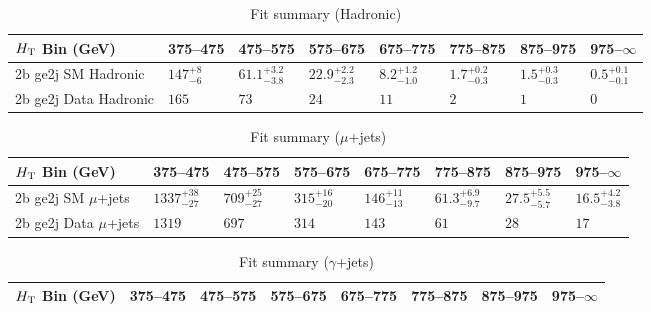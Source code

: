 \documentclass[8pt]{article}
\def\scalht{\mbox{$H_{\rm{T}}$}\xspace}
\newcommand\T{\rule{0pt}{2.6ex}}
\begin{document}
\begin{table}[ht!]
\caption{Fit summary (Hadronic)}
\label{tab:ensemble-summary}
\centering
\begin{tabular}{ llllllll }

\hline
\scalht Bin (GeV)       & 375--475                       & 475--575                       & 575--675                       & 675--775                       & 775--875                       & 875--975                       & 975--$\infty$                  \\ [1.000000ex]
\hline
2b ge2j SM Hadronic\T   & $147^{+8}_{-6}$                & $61.1^{+3.2}_{-3.8}$           & $22.9^{+2.2}_{-2.3}$           & $8.2^{+1.2}_{-1.0}$            & $1.7^{+0.2}_{-0.3}$            & $1.5^{+0.3}_{-0.3}$            & $0.5^{+0.1}_{-0.1}$            \\ 
2b ge2j Data Hadronic\T & $165$                          & $73$                           & $24$                           & $11$                           & $2$                            & $1$                            & $0$                            \\ 
\hline

\end{tabular}
\end{table}
\begin{table}[ht!]
\caption{Fit summary ($\mu$+jets)}
\label{tab:ensemble-summary}
\centering
\begin{tabular}{ llllllll }

\hline
\scalht Bin (GeV)       & 375--475                       & 475--575                       & 575--675                       & 675--775                       & 775--875                       & 875--975                       & 975--$\infty$                  \\ [1.000000ex]
\hline
2b ge2j SM $\mu$+jets\T & $1337^{+38}_{-27}$             & $709^{+25}_{-27}$              & $315^{+16}_{-20}$              & $146^{+11}_{-13}$              & $61.3^{+6.9}_{-9.7}$           & $27.5^{+5.5}_{-5.7}$           & $16.5^{+4.2}_{-3.8}$           \\ 
2b ge2j Data $\mu$+jets\T & $1319$                         & $697$                          & $314$                          & $143$                          & $61$                           & $28$                           & $17$                           \\ 
\hline

\end{tabular}
\end{table}
\begin{table}[ht!]
\caption{Fit summary ($\gamma$+jets)}
\label{tab:ensemble-summary}
\centering
\begin{tabular}{ llllllll }

\hline
\scalht Bin (GeV)       & 375--475                       & 475--575                       & 575--675                       & 675--775                       & 775--875                       & 875--975                       & 975--$\infty$                  \\ [1.000000ex]
\hline

\end{tabular}
\end{table}
\end{document}
